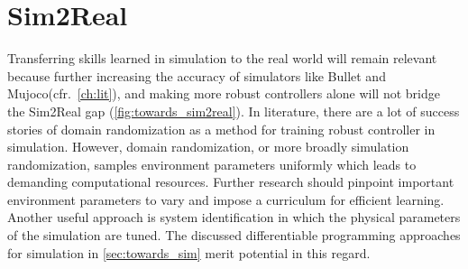 \documentclass[\home/main.tex]{subfiles}
\begin{document}
\section{Sim2Real}
Transferring skills learned in simulation to the real world will remain relevant because further increasing the accuracy of simulators like Bullet and Mujoco(cfr.\ \cref{ch:lit}), and making more robust controllers alone will not bridge the Sim2Real gap (\cref{fig:towards_sim2real}). In literature, there are a lot of success stories of domain randomization as a method for training robust controller in simulation. However, domain randomization, or more broadly simulation randomization, samples environment parameters uniformly which leads to demanding computational resources. Further research should pinpoint important environment parameters to vary and impose a curriculum for efficient learning. Another useful approach is system identification in which the physical parameters of the simulation are tuned. The discussed differentiable programming approaches for simulation in \cref{sec:towards_sim} merit potential in this regard.
\end{document}
